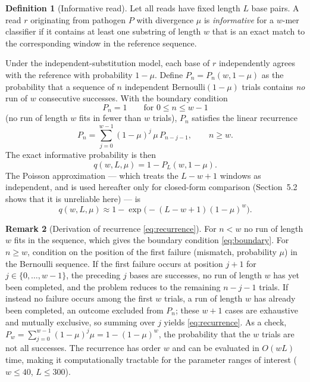 \documentclass[12pt]{article}
\theoremstyle{definition}
\newtheorem{definition}{Definition}[section]
\newtheorem{remark}[definition]{Remark}
\theoremstyle{plain}
\begin{document}
\begin{definition}[Informative read]\label{def:informative}
Let all reads have fixed length $L$ base pairs. A read $r$ originating from
pathogen $P$ with divergence $\mu$ is \emph{informative} for a $w$-mer
classifier if it contains at least one substring of length $w$ that is an
exact match to the corresponding window in the reference sequence.
\end{definition}

Under the independent-substitution model, each base of $r$ independently
agrees with the reference with probability $1-\mu$. Define
$P_n=P_n(w,1-\mu)$ as the probability that a sequence of $n$ independent
Bernoulli$(1-\mu)$ trials contains \emph{no} run of $w$ consecutive
successes. With the boundary condition
\begin{equation}\label{eq:boundary}
  P_n=1\qquad\text{for }0\le n\le w-1
\end{equation}
(no run of length $w$ fits in fewer than $w$ trials), $P_n$ satisfies the
linear recurrence
\begin{equation}\label{eq:recurrence}
  P_n=\sum_{j=0}^{w-1}(1-\mu)^{j}\,\mu\,P_{n-j-1},\qquad n\ge w.
\end{equation}
The exact informative probability is then
\begin{equation}\label{eq:qexact}
  q(w,L,\mu)=1-P_L(w,1-\mu).
\end{equation}
The Poisson approximation --- which treats the $L-w+1$ windows as
independent, and is used hereafter only for closed-form comparison
(Section~5.2 shows that it is unreliable here) --- is
\begin{equation}\label{eq:poisson}
  q(w,L,\mu)\approx 1-\exp\!\bigl(-(L-w+1)(1-\mu)^{w}\bigr).
\end{equation}

\begin{remark}[Derivation of recurrence \eqref{eq:recurrence}]\label{rem:deriv}
For $n<w$ no run of length $w$ fits in the sequence, which gives the
boundary condition \eqref{eq:boundary}. For $n\ge w$, condition on the
position of the first failure (mismatch, probability $\mu$) in the Bernoulli
sequence. If the first failure occurs at position $j+1$ for
$j\in\{0,\dots,w-1\}$, the preceding $j$ bases are successes, no run of
length $w$ has yet been completed, and the problem reduces to the remaining
$n-j-1$ trials. If instead no failure occurs among the first $w$ trials, a
run of length $w$ has already been completed, an outcome excluded from
$P_n$; these $w+1$ cases are exhaustive and mutually exclusive, so summing
over $j$ yields \eqref{eq:recurrence}. As a check,
$P_w=\sum_{j=0}^{w-1}(1-\mu)^{j}\mu=1-(1-\mu)^{w}$, the probability that the
$w$ trials are not all successes. The recurrence has order $w$ and can be
evaluated in $O(wL)$ time, making it computationally tractable for the
parameter ranges of interest ($w\le 40$, $L\le 300$).
\end{remark}
\end{document}
